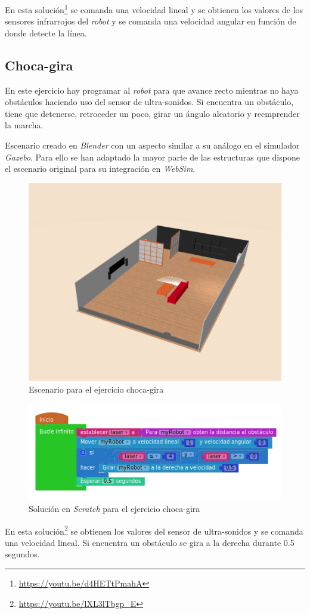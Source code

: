     En esta solución\footnote{\url{https://youtu.be/d4HETtPmahA}} se comanda una velocidad lineal y se obtienen los valores de los sensores infrarrojos del \textit{robot} y se comanda una velocidad angular en función de donde detecte la línea.
    
\subsection{Choca-gira}
\label{subsec:chocagira}
En este ejercicio hay programar al \textit{robot} para que avance recto mientras no haya obstáculos haciendo uso del sensor de ultra-sonidos. Si encuentra un obstáculo, tiene que detenerse, retroceder un poco, girar un ángulo aleatorio y reemprender la marcha.

Escenario creado en \textit{Blender} con un aspecto similar a su análogo en el simulador \textit{Gazebo}. Para ello se han adaptado la mayor parte de las estructuras que dispone el escenario original para su integración en \textit{WebSim}. 

    \begin{figure}[H]
    \centering
    \includegraphics[scale=0.3]{img/bump&go.png}
    \caption{Escenario para el ejercicio choca-gira} \label{fig:chocagira}
    \end{figure}
    \begin{figure}[H]
    \centering
    \includegraphics[scale=0.5]{img/chocagiracodigo.png}
    \caption{Solución en \textit{Scratch} para el ejercicio choca-gira} 
    \label{fig:chocagiraSolution}
    \end{figure}
    En esta solución\footnote{\url{https://youtu.be/lXL3lTbgp_E}} se obtienen los valores del sensor de ultra-sonidos y se comanda una velocidad lineal. Si encuentra un obstáculo se gira a la derecha durante 0.5 segundos.
    
